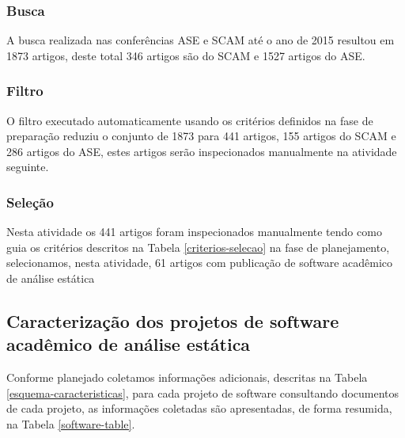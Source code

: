 \subsubsection{Busca}

A busca realizada nas conferências ASE e SCAM até o ano de 2015 resultou em
1873 artigos, deste total 346 artigos são do SCAM e 1527 artigos do ASE.


\subsubsection{Filtro}

O filtro executado automaticamente usando os critérios definidos na fase de
preparação reduziu o conjunto de 1873 para 441 artigos, 155 artigos do SCAM e
286 artigos do ASE, estes artigos serão inspecionados manualmente na atividade
seguinte.

\subsubsection{Seleção}

Nesta atividade os 441 artigos foram inspecionados manualmente tendo como guia
os critérios descritos na Tabela \ref{criterios-selecao} na fase de
planejamento, selecionamos, nesta atividade, 61 artigos com publicação de
software acadêmico de análise estática

\subsection{Caracterização dos projetos de software acadêmico de análise estática}


Conforme planejado coletamos informações adicionais, descritas na Tabela
\ref{esquema-caracteristicas}, para cada projeto de software consultando
documentos de cada projeto, as informações coletadas são apresentadas, de forma
resumida, na Tabela \ref{software-table}.

